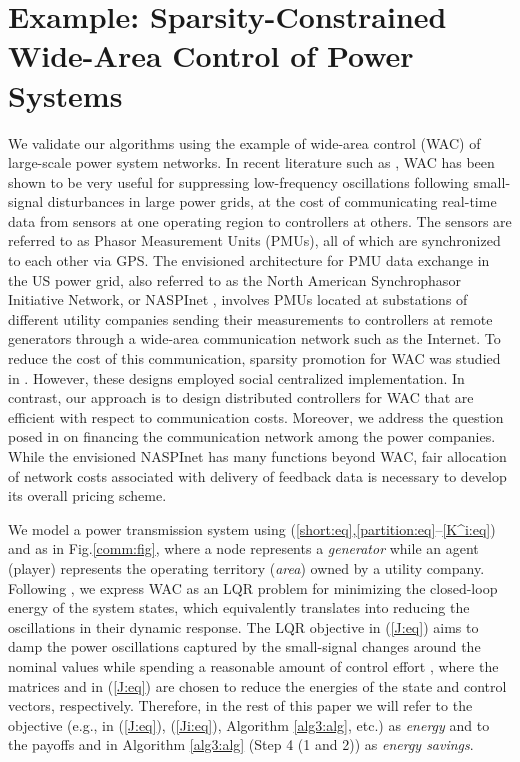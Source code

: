 \documentclass[12pt, draftclsnofoot,onecolumn]{IEEEtran}
\begin{document}
\section{Example: Sparsity-Constrained Wide-Area Control of Power Systems}

\label{WAC:sec}
We validate our algorithms using the example of wide-area control (WAC) of large-scale power system networks. In recent literature such as \cite{dorjovchebulTPS14,pramod}, WAC has been shown to be very useful for suppressing low-frequency oscillations following small-signal disturbances in large power grids, at the cost of communicating real-time data from sensors at one operating region to controllers at others. The sensors are referred to as Phasor Measurement Units (PMUs), all of which are synchronized to each other via GPS. The envisioned architecture for PMU data exchange in the US power grid, also referred to as the North American Synchrophasor Initiative Network, or NASPInet \cite{naspinet}, involves PMUs located at substations of different utility companies sending their measurements to controllers at remote generators through a wide-area communication network such as the Internet. To reduce the cost of this communication, sparsity promotion for WAC was studied in \cite{dorjovchebulTPS14,lin2013design}. However, these designs employed social centralized implementation. In contrast, our approach is to design distributed controllers for WAC that are efficient with respect to communication costs. Moreover, we address the question posed in \cite{naspinet} on financing the communication network among the power companies. While the envisioned NASPInet has many functions beyond WAC, fair allocation of network costs associated with delivery of feedback data is necessary to develop its overall pricing scheme.





We model a power transmission system using (\ref{short:eq},\ref{partition:eq}--\ref{K^i:eq}) and as in Fig.\ref{comm:fig}, where a node represents a {\it generator} while an agent (player) represents the operating territory ({\it area}) owned by a utility company. Following \cite{dorjovchebulTPS14,lianensuring}, we express WAC as an LQR problem for minimizing the closed-loop energy of the system states, which equivalently translates into reducing the oscillations in their dynamic response. The LQR objective in (\ref{J:eq}) aims to damp the power oscillations captured by the small-signal changes around the nominal values while spending a reasonable amount of control effort \cite{dorjovchebulTPS14}, where the matrices  and  in (\ref{J:eq}) are chosen to reduce the energies of the state and control vectors, respectively. Therefore, in the rest of this paper we will refer to the objective (e.g., in (\ref{J:eq}), (\ref{Ji:eq}), Algorithm \ref{alg3:alg}, etc.) as {\it energy} and to the payoffs  and  in Algorithm \ref{alg3:alg} (Step 4 (1 and 2)) as {\it energy savings}. 
 
\end{document}
